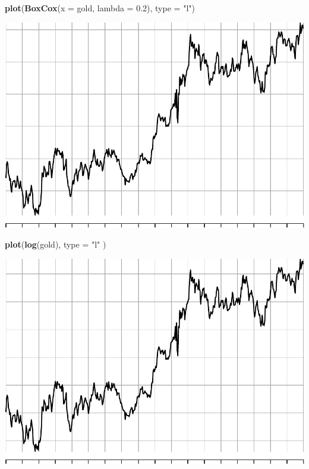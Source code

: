 \documentclass[
]{article}
\newenvironment{Shaded}{\begin{snugshade}}{\end{snugshade}}
\newcommand{\AttributeTok}[1]{\textcolor[rgb]{0.13,0.29,0.53}{#1}}
\newcommand{\FloatTok}[1]{\textcolor[rgb]{0.00,0.00,0.81}{#1}}
\newcommand{\FunctionTok}[1]{\textcolor[rgb]{0.13,0.29,0.53}{\textbf{#1}}}
\newcommand{\NormalTok}[1]{#1}
\newcommand{\StringTok}[1]{\textcolor[rgb]{0.31,0.60,0.02}{#1}}
\begin{document}
\begin{Shaded}
\begin{Highlighting}[]
\FunctionTok{plot}\NormalTok{(}\FunctionTok{BoxCox}\NormalTok{(}\AttributeTok{x =}\NormalTok{ gold, }\AttributeTok{lambda =} \FloatTok{0.2}\NormalTok{), }\AttributeTok{type =} \StringTok{"l"}\NormalTok{)}
\end{Highlighting}
\end{Shaded}

\begin{center}\includegraphics[width=0.8\linewidth]{Timeseries_Analysis_HW4_files/figure-latex/unnamed-chunk-12-1} \end{center}

\begin{Shaded}
\begin{Highlighting}[]
\FunctionTok{plot}\NormalTok{(}\FunctionTok{log}\NormalTok{(gold), }\AttributeTok{type =} \StringTok{"l"}\NormalTok{ )}
\end{Highlighting}
\end{Shaded}

\begin{center}\includegraphics[width=0.8\linewidth]{Timeseries_Analysis_HW4_files/figure-latex/unnamed-chunk-12-2} \end{center}
\end{document}
